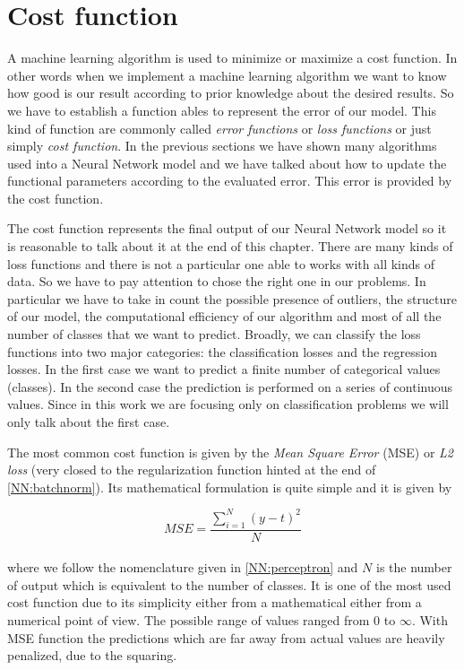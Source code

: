 \documentclass{standalone}
\begin{document}
\section[Cost function]{Cost function}\label{NN:cost}

A machine learning algorithm is used to minimize or maximize a cost function.
In other words when we implement a machine learning algorithm we want to know how good is our result according to prior knowledge about the desired results.
So we have to establish a function ables to represent the error of our model.
This kind of function are commonly called \emph{error functions} or \emph{loss functions} or just simply \emph{cost function}.
In the previous sections we have shown many algorithms used into a Neural Network model and we have talked about how to update the functional parameters according to the evaluated error.
This error is provided by the cost function.

The cost function represents the final output of our Neural Network model so it is reasonable to talk about it at the end of this chapter.
There are many kinds of loss functions and there is not a particular one able to works with all kinds of data.
So we have to pay attention to chose the right one in our problems.
In particular we have to take in count the possible presence of outliers, the structure of our model, the computational efficiency of our algorithm and most of all the number of classes that we want to predict.
Broadly, we can classify the loss functions into two major categories: the classification losses and the regression losses.
In the first case we want to predict a finite number of categorical values (classes).
In the second case the prediction is performed on a series of continuous values.
Since in this work we are focusing only on classification problems we will only talk about the first case.

The most common cost function is given by the \emph{Mean Square Error} (MSE) or \emph{L2 loss} (very closed to the regularization function hinted at the end of \ref{NN:batchnorm}).
Its mathematical formulation is quite simple and it is given by

$$
MSE = \frac{\sum_{i=1}^{N}\left( y - t \right)^2}{N}
$$
\\
where we follow the nomenclature given in \ref{NN:perceptron} and $N$ is the number of output which is equivalent to the number of classes.
It is one of the most used cost function due to its simplicity either from a mathematical either from a numerical point of view.
The possible range of values ranged from 0 to $\infty$.
With MSE function the predictions which are far away from actual values are heavily penalized, due to the squaring.
\end{document}

